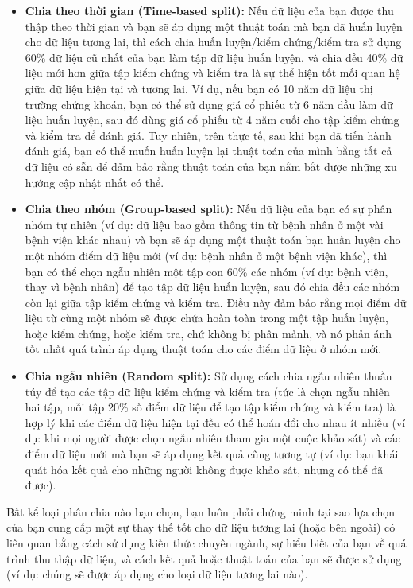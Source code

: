 \begin{itemize}
    \item \textbf{Chia theo thời gian (Time-based split):} Nếu dữ liệu của bạn được thu thập theo thời gian và bạn sẽ áp dụng một thuật toán mà bạn đã huấn luyện cho dữ liệu tương lai, thì cách chia huấn luyện/kiểm chứng/kiểm tra sử dụng 60\% dữ liệu cũ nhất của bạn làm tập dữ liệu huấn luyện, và chia đều 40\% dữ liệu mới hơn giữa tập kiểm chứng và kiểm tra là sự thể hiện tốt mối quan hệ giữa dữ liệu hiện tại và tương lai. Ví dụ, nếu bạn có 10 năm dữ liệu thị trường chứng khoán, bạn có thể sử dụng giá cổ phiếu từ 6 năm đầu làm dữ liệu huấn luyện, sau đó dùng giá cổ phiếu từ 4 năm cuối cho tập kiểm chứng và kiểm tra để đánh giá. Tuy nhiên, trên thực tế, sau khi bạn đã tiến hành đánh giá, bạn có thể muốn huấn luyện lại thuật toán của mình bằng tất cả dữ liệu có sẵn để đảm bảo rằng thuật toán của bạn nắm bắt được những xu hướng cập nhật nhất có thể.
    \item \textbf{Chia theo nhóm (Group-based split):} Nếu dữ liệu của bạn có sự phân nhóm tự nhiên (ví dụ: dữ liệu bao gồm thông tin từ bệnh nhân ở một vài bệnh viện khác nhau) và bạn sẽ áp dụng một thuật toán bạn huấn luyện cho một nhóm điểm dữ liệu mới (ví dụ: bệnh nhân ở một bệnh viện khác), thì bạn có thể chọn ngẫu nhiên một tập con 60\% các nhóm (ví dụ: bệnh viện, thay vì bệnh nhân) để tạo tập dữ liệu huấn luyện, sau đó chia đều các nhóm còn lại giữa tập kiểm chứng và kiểm tra. Điều này đảm bảo rằng mọi điểm dữ liệu từ cùng một nhóm sẽ được chứa hoàn toàn trong một tập huấn luyện, hoặc kiểm chứng, hoặc kiểm tra, chứ không bị phân mảnh, và nó phản ánh tốt nhất quá trình áp dụng thuật toán cho các điểm dữ liệu ở nhóm mới.
    \item \textbf{Chia ngẫu nhiên (Random split):} Sử dụng cách chia ngẫu nhiên thuần túy để tạo các tập dữ liệu kiểm chứng và kiểm tra (tức là chọn ngẫu nhiên hai tập, mỗi tập 20\% số điểm dữ liệu để tạo tập kiểm chứng và kiểm tra) là hợp lý khi các điểm dữ liệu hiện tại đều có thể hoán đổi cho nhau ít nhiều (ví dụ: khi mọi người được chọn ngẫu nhiên tham gia một cuộc khảo sát) và các điểm dữ liệu mới mà bạn sẽ áp dụng kết quả cũng tương tự (ví dụ: bạn khái quát hóa kết quả cho những người không được khảo sát, nhưng có thể đã được).
\end{itemize}

Bất kể loại phân chia nào bạn chọn, bạn luôn phải chứng minh tại sao lựa chọn của bạn cung cấp một sự thay thế tốt cho dữ liệu tương lai (hoặc bên ngoài) có liên quan bằng cách sử dụng kiến thức chuyên ngành, sự hiểu biết của bạn về quá trình thu thập dữ liệu, và cách kết quả hoặc thuật toán của bạn sẽ được sử dụng (ví dụ: chúng sẽ được áp dụng cho loại dữ liệu tương lai nào).

